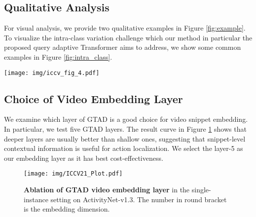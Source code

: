 \documentclass{bmvc2k}
\begin{document}
\subsection{Qualitative Analysis}
For visual analysis, we provide two qualitative examples in Figure \ref{fig:example}.
To visualize the intra-class variation challenge which our  method in particular the proposed query  adaptive  Transformer aims to address,
we show some common examples in 
Figure \ref{fig:intra_class}.


\begin{figure*}[h]
\begin{center}
  \texttt{[image: img/iccv\_fig\_4.pdf]}
\end{center}
\caption{\textbf{Qualitative results} of (a) ``BreakDancing`` class on ActivityNet and (b) ``Throw Discuss`` class on THUMOS. 
}
\vspace{-.15in}
\label{fig:example}
\end{figure*}




\subsection{Choice of Video Embedding Layer}
We examine which layer of GTAD \cite{xu2020gtad}
is a good choice for video snippet embedding.
In particular, we test five GTAD layers.
The result curve in Figure \ref{fig:gtad_layer} shows that
deeper layers are usually better than shallow ones,
suggesting that snippet-level contextual information is useful for action localization.
We select the layer-5 as our embedding layer 
as it has best cost-effectiveness.

\begin{figure}[!htbp]
\begin{center}
  \texttt{[image: img/ICCV21\_Plot.pdf]}
\end{center}
\caption{\textbf{Ablation of GTAD video embedding layer} in the single-instance setting on ActivityNet-v1.3.
The number in round bracket is the embedding dimension.
}
\label{fig:gtad_layer}
\end{figure}
\end{document}

